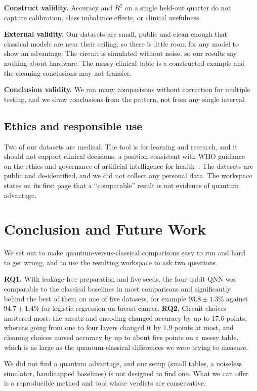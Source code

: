 \documentclass[12pt,onecolumn,draftclsnofoot]{IEEEtran}
\begin{document}
\textbf{Construct validity.} Accuracy and $R^2$ on a single held-out quarter do not capture calibration, class imbalance effects, or clinical usefulness.

\textbf{External validity.} Our datasets are small, public and clean enough that classical models are near their ceiling, so there is little room for any model to show an advantage. The circuit is simulated without noise, so our results say nothing about hardware. The messy clinical table is a constructed example and the cleaning conclusions may not transfer.

\textbf{Conclusion validity.} We ran many comparisons without correction for multiple testing, and we draw conclusions from the pattern, not from any single interval.

\subsection{Ethics and responsible use}
Two of our datasets are medical. The tool is for learning and research, and it should not support clinical decisions, a position consistent with WHO guidance on the ethics and governance of artificial intelligence for health~\cite{who2021ethics}. The datasets are public and de-identified, and we did not collect any personal data. The workspace states on its first page that a ``comparable'' result is not evidence of quantum advantage.

\section{Conclusion and Future Work}
We set out to make quantum-versus-classical comparisons easy to run and hard to get wrong, and to use the resulting workspace to ask two questions.

\textbf{RQ1.} With leakage-free preparation and five seeds, the four-qubit QNN was comparable to the classical baselines in most comparisons and significantly behind the best of them on one of five datasets, for example $93.8\pm1.3\%$ against $94.7\pm1.4\%$ for logistic regression on breast cancer. \textbf{RQ2.} Circuit choices mattered most: the ansatz and encoding changed accuracy by up to 17.6 points, whereas going from one to four layers changed it by 1.9 points at most, and cleaning choices moved accuracy by up to about five points on a messy table, which is as large as the quantum-classical differences we were trying to measure.

We did not find a quantum advantage, and our setup (small tables, a noiseless simulator, handicapped baselines) is not designed to find one. What we can offer is a reproducible method and tool whose verdicts are conservative.
\end{document}
